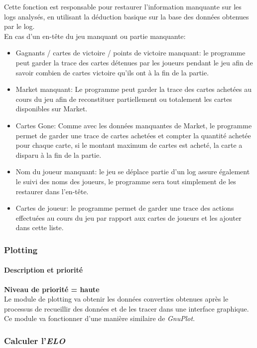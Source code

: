 Cette fonction est responsable pour restaurer l'information manquante sur les logs analysés, en utilisant la déduction basique sur la base des données obtenues par le log.\\
En cas d'un en-tête du jeu manquant ou partie manquante:
  \begin{itemize}
\item Gagnants / cartes de victoire / points de victoire manquant: le programme peut garder la trace des cartes détenues par les joueurs pendant le jeu afin de savoir combien de cartes victoire qu'ils ont à la fin de la partie.
\item Market manquant: Le programme peut garder la trace des cartes achetées au cours du jeu afin de reconstituer partiellement ou totalement les cartes disponibles sur Market.
\item Cartes Gone: Comme avec les données manquantes de Market, le programme permet de garder une trace de cartes achetées et compter la quantité achetée pour chaque carte, si le montant maximum de cartes est acheté, la carte a disparu à la fin de la partie.
\item Nom du joueur manquant: le jeu se déplace partie d'un log assure également le suivi des noms des joueurs, le programme sera tout simplement de les restaurer dans l'en-tête.
\item Cartes de joueur: le programme permet de garder une trace des actions effectuées au cours du jeu par rapport aux cartes de joueurs et les ajouter dans cette liste.
  \end{itemize}

\subsubsection{Plotting}
\paragraph*{Description et priorité}
\textbf{Niveau de priorité = haute}\\

Le module de plotting va obtenir les données converties obtenues après le processus de recueillir des données et de les tracer dans une interface graphique. Ce module va fonctionner d'une manière similaire de \textit{GnuPlot}.

\subsubsection{Calculer l'\textit{\textbf{ELO}}}
